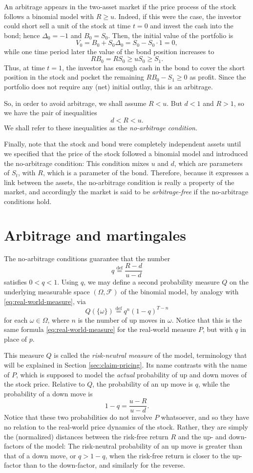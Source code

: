 \documentclass[reqno]{amsart}
\theoremstyle{definition}
\numberwithin{equation}{section}
\begin{document}
An arbitrage appears in the two-asset market if the price process of the stock follows a binomial model with $R \geq u$. Indeed, if this were the case, the investor could short sell a unit of the stock at time $t=0$ and invest the cash into the bond; hence $\Delta_0=-1$ and $B_0 = S_0$. Then, the initial value of the portfolio is
	\[
	V_0 = B_0 + S_0\Delta_0 = S_0 - S_0 \cdot 1 =0,
	\]
while one time period later the value of the bond position increases to
	\[
	RB_0 = RS_0 \geq uS_0 \geq S_1.
	\]
Thus, at time $t=1$, the investor has enough cash in the bond to cover the short position in the stock and pocket the remaining $RB_0 - S_1 \geq 0$ as profit. Since the portfolio does not require any (net) initial outlay, this is an arbitrage.

So, in order to avoid arbitrage, we shall assume $R < u$. But $d<1$ and $R>1$, so we have the pair of inequalities
	\[
	d < R < u.
	\]
We shall refer to these inequalities as the \textit{no-arbitrage condition}.

Finally, note that the stock and bond were completely independent assets until we specified that the price of the stock followed a binomial model and introduced the no-arbitrage condition: This condition mixes $u$ and $d$, which are parameters of $S_t$, with $R$, which is a parameter of the bond. Therefore, because it expresses a link between the assets, the no-arbitrage condition is really a property of the market, and accordingly the market is said to be \textit{arbitrage-free} if the no-arbitrage conditions hold.

\section{Arbitrage and martingales}

The no-arbitrage conditions guarantee that the number
	\[
	q \stackrel{\text{def}}{=} \frac{R-d}{u-d}
	\]
satisfies $0 < q < 1$. Using $q$, we may define a second probability measure $Q$ on the underlying measurable space $(\Omega, \mathcal{F})$ of the binomial model, by analogy with \eqref{eq:real-world-measure}, via
	\[
	Q(\{\omega\}) \stackrel{\text{def}}{=} q^n (1-q)^{T-n}
	\]
for each $\omega \in \Omega$, where $n$ is the number of up moves in $\omega$. Notice that this is the same formula \eqref{eq:real-world-measure} for the real-world measure $P$, but with $q$ in place of $p$.

This measure $Q$ is called the \textit{risk-neutral measure} of the model, terminology that will be explained in Section \ref{sec:claim-pricing}. Its name contrasts with the name of $P$, which is supposed to model the \textit{actual} probability of up and down moves of the stock price. Relative to $Q$, the probability of an up move is $q$, while the probability of a down move is
	\[
	1-q = \frac{u-R}{u-d}.
	\]
Notice that these two probabilities do not involve $P$ whatsoever, and so they have no relation to the real-world price dynamics of the stock. Rather, they are simply the (normalized) distances between the risk-free return $R$ and the up- and down-factors of the model: The risk-neutral probability of an up move is greater than that of a down move, or $q> 1-q$, when the risk-free return is closer to the up-factor than to the down-factor, and similarly for the reverse.
\end{document}
